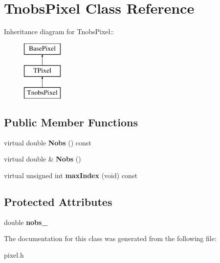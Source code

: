\hypertarget{classTnobsPixel}{
\section{TnobsPixel Class Reference}
\label{classTnobsPixel}
}
Inheritance diagram for TnobsPixel::\begin{figure}[H]
\begin{center}
\leavevmode
\includegraphics[height=3cm]{classTnobsPixel}
\end{center}
\end{figure}
\subsection*{Public Member Functions}
\begin{DoxyCompactItemize}
\item 
\hypertarget{classTnobsPixel_a042bb3c3e4a80eba007c640c14ceb01b}{
virtual double {\bfseries Nobs} () const }
\label{classTnobsPixel_a042bb3c3e4a80eba007c640c14ceb01b}

\item 
\hypertarget{classTnobsPixel_a7f2beb18eec0c3680b82679a80d7bf77}{
virtual double \& {\bfseries Nobs} ()}
\label{classTnobsPixel_a7f2beb18eec0c3680b82679a80d7bf77}

\item 
\hypertarget{classTnobsPixel_a8d3bcd8cc11a670841700a703781772f}{
virtual unsigned int {\bfseries maxIndex} (void) const }
\label{classTnobsPixel_a8d3bcd8cc11a670841700a703781772f}

\end{DoxyCompactItemize}
\subsection*{Protected Attributes}
\begin{DoxyCompactItemize}
\item 
\hypertarget{classTnobsPixel_a7cfe400e2861ccbdf15374de6f928490}{
double {\bfseries nobs\_\-}}
\label{classTnobsPixel_a7cfe400e2861ccbdf15374de6f928490}

\end{DoxyCompactItemize}


The documentation for this class was generated from the following file:\begin{DoxyCompactItemize}
\item 
pixel.h\end{DoxyCompactItemize}
